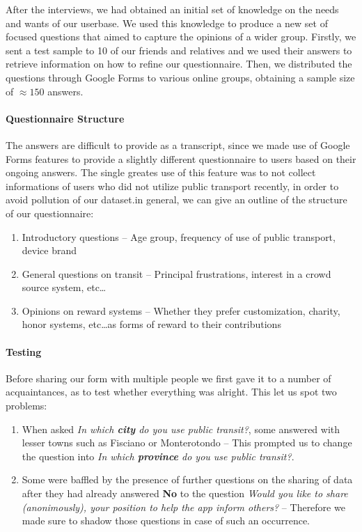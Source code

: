 \documentclass[a4paper, 11pt]{report}
\begin{document}
After the interviews, we had obtained an initial set of knowledge on the needs and wants of
our userbase. We used this knowledge to produce a new set of focused questions that aimed
to capture the opinions of a wider group. Firstly, we sent a test sample to 10 of our friends
and relatives and we used their answers to retrieve information on how to refine our questionnaire.
Then, we distributed the questions through Google Forms to various online groups, 
obtaining a sample size of $\approx150$ answers.

\paragraph{Questionnaire Structure}

The answers are difficult to provide as a transcript, since we made use of Google Forms
features to provide a slightly different questionnaire to users based on their ongoing answers.
The single greates use of this feature was to not collect informations of users who did not
utilize public transport recently, in order to avoid pollution of our dataset.\@ in
general, we can give an outline of the structure of our questionnaire:

\begin{enumerate}
	\item Introductory questions -- Age group, frequency of use of public transport, device brand
	\item General questions on transit -- Principal frustrations, interest in a crowd source system, etc\dots
	\item Opinions on reward systems -- Whether they prefer customization, charity, honor systems, etc\dots\@ as
	      forms of reward to their contributions
\end{enumerate}

\paragraph{Testing}
Before sharing our form with multiple people we first gave it to a number of acquaintances,
as to test whether everything was alright. This let us spot two problems:
\begin{enumerate}
	\item When asked \emph{In which \textbf{city} do you use public transit?}, some answered
	with lesser towns such as Fisciano or Monterotondo -- This prompted us to change the
	question into \emph{In which \textbf{province} do you use public transit?}.
	\item Some were baffled by the presence of further questions on the sharing of data after
	they had already answered \textbf{No} to the question \emph{Would you like to share
	(anonimously), your position to help the app inform others?} -- Therefore we made sure to
	shadow those questions in case of such an occurrence.
\end{enumerate}
\end{document}
